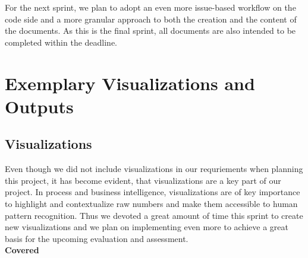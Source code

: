 \documentclass[12pt,a4paper]{article}
\begin{document}
For the next sprint, we plan to adopt an even more issue-based workflow on the code side and a more granular approach to both the creation and the content of the documents. As this is the final sprint, all documents are also intended to be completed within the deadline.

\section{Exemplary Visualizations and Outputs}
\subsection{Visualizations}
Even though we did not include visualizations in our requriements when planning this project, it has become evident, that visualizations are a key part of our project. In process and business intelligence, visualizations are of key importance to highlight and contextualize raw numbers and make them accessible to human pattern recognition. Thus we devoted a great amount of time this sprint to create new visualizations and we plan on implementing even more to achieve a great basis for the upcoming evaluation and assessment. \\
\textbf{Covered}\\\\
\end{document}
